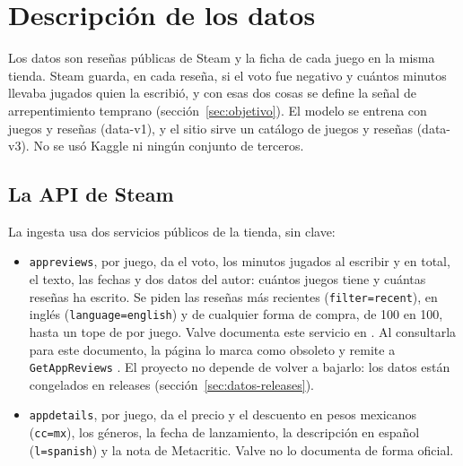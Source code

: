\section{Descripción de los datos}\label{sec:datos}

Los datos son reseñas públicas de Steam y la ficha de cada juego en la misma tienda. Steam
guarda, en cada reseña, si el voto fue negativo y cuántos minutos llevaba jugados quien la
escribió, y con esas dos cosas se define la señal de arrepentimiento temprano
(sección~\ref{sec:objetivo}). El modelo se entrena con \cifraJuegosEntrenamiento{}
juegos y \cifraResenasEntrenamiento{} reseñas (data-v1), y el sitio sirve un catálogo de
\cifraJuegosCatalogo{} juegos y \cifraResenasCatalogo{} reseñas (data-v3). No se usó Kaggle ni
ningún conjunto de terceros.

\subsection{La API de Steam}\label{sec:datos-api}

La ingesta usa dos servicios públicos de la tienda, sin clave:

\begin{itemize}
  \item \texttt{appreviews}, por juego, da el voto, los minutos jugados al escribir y en total,
  el texto, las fechas y dos datos del autor: cuántos juegos tiene y cuántas reseñas ha
  escrito. Se piden las reseñas más recientes (\texttt{filter=recent}), en inglés
  (\texttt{language=english}) y de cualquier forma de compra, de 100 en 100, hasta un tope de
  \cifraTopeIngesta{} por juego. Valve documenta este servicio en \textcite{valve_getreviews}.
  Al consultarla para este documento, la página lo marca como obsoleto y remite a
  \texttt{GetAppReviews} \parencite{valve_iuserreviews}. El proyecto no depende de volver a
  bajarlo: los datos están congelados en releases (sección~\ref{sec:datos-releases}).
  \item \texttt{appdetails}, por juego, da el precio y el descuento en pesos mexicanos
  (\texttt{cc=mx}), los géneros, la fecha de lanzamiento, la descripción en español
  (\texttt{l=spanish}) y la nota de Metacritic. Valve no lo documenta de forma oficial.
\end{itemize}

